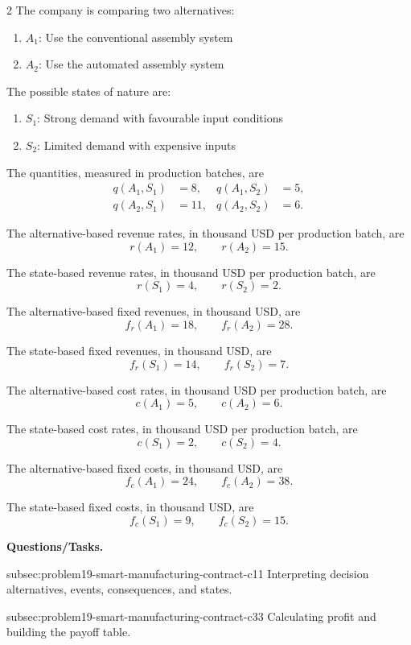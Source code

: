 \begin{multicols}{2}
	The company is comparing two alternatives:
	\begin{enumerate}[label=\arabic*.]
		\item \(A_1\): Use the conventional assembly system
		\item \(A_2\): Use the automated assembly system
	\end{enumerate}
	
	The possible states of nature are:
	\begin{enumerate}[label=\arabic*.]
		\item \(S_1\): Strong demand with favourable input conditions
		\item \(S_2\): Limited demand with expensive inputs
	\end{enumerate}
	
	The quantities, measured in production batches, are
	\[
	\begin{aligned}
		q(A_1,S_1)&=8,
		&
		q(A_1,S_2)&=5,
		\\
		q(A_2,S_1)&=11,
		&
		q(A_2,S_2)&=6.
	\end{aligned}
	\]
	
	The alternative-based revenue rates, in thousand USD per production
	batch, are
	\[
	r(A_1)=12,
	\qquad
	r(A_2)=15.
	\]
	
	The state-based revenue rates, in thousand USD per production batch, are
	\[
	r(S_1)=4,
	\qquad
	r(S_2)=2.
	\]
	
	\columnbreak
	
	The alternative-based fixed revenues, in thousand USD, are
	\[
	f_r(A_1)=18,
	\qquad
	f_r(A_2)=28.
	\]
	
	The state-based fixed revenues, in thousand USD, are
	\[
	f_r(S_1)=14,
	\qquad
	f_r(S_2)=7.
	\]
	
	The alternative-based cost rates, in thousand USD per production
	batch, are
	\[
	c(A_1)=5,
	\qquad
	c(A_2)=6.
	\]
	
	The state-based cost rates, in thousand USD per production batch, are
	\[
	c(S_1)=2,
	\qquad
	c(S_2)=4.
	\]
	
	The alternative-based fixed costs, in thousand USD, are
	\[
	f_c(A_1)=24,
	\qquad
	f_c(A_2)=38.
	\]
	
	The state-based fixed costs, in thousand USD, are
	\[
	f_c(S_1)=9,
	\qquad
	f_c(S_2)=15.
	\]
\end{multicols}

\textbf{Questions/Tasks.}
\begin{enumerate}
	\CriterionTask
	{subsec:problem19-smart-manufacturing-contract-c1}{1}
	{Interpreting decision alternatives, events, consequences, and states.}

	\CriterionTask
	{subsec:problem19-smart-manufacturing-contract-c3}{3}
	{Calculating profit and building the payoff table.}
\end{enumerate}

